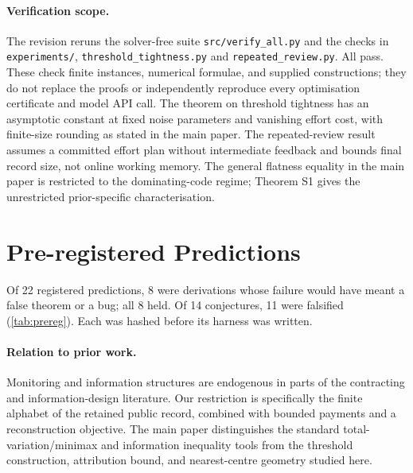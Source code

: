 \documentclass[sigconf,anonymous,acmthm=false]{aamas}
\theoremstyle{acmplain}
\theoremstyle{acmdefinition}
\begin{document}
\paragraph{Verification scope.} The revision reruns the solver-free suite
\texttt{src/verify\_all.py} and the checks in \texttt{experiments/},
\texttt{threshold\_tightness.py} and
\texttt{repeated\_review.py}. All pass. These check finite instances,
numerical formulae, and supplied constructions; they do not replace the proofs
or independently reproduce every optimisation certificate and model API call.
The theorem on threshold tightness has an asymptotic constant at fixed noise
parameters and vanishing effort cost, with finite-size rounding as stated in
the main paper. The repeated-review result assumes a committed effort plan
without intermediate feedback and bounds final record size, not online
working memory. The general flatness equality in the main paper is restricted
to the dominating-code regime; Theorem S1 gives the unrestricted prior-specific
characterisation.

\section{Pre-registered Predictions}
Of 22 registered predictions, 8 were derivations whose failure would have meant a false
theorem or a bug; all 8 held. Of 14 conjectures, 11 were falsified (\cref{tab:prereg}). Each
was hashed before its harness was written.




\paragraph{Relation to prior work.} Monitoring and information structures are
endogenous in parts of the contracting and information-design literature.
Our restriction is specifically the finite alphabet of the retained public
record, combined with bounded payments and a reconstruction objective. The
main paper distinguishes the standard total-variation/minimax and information
inequality tools from the threshold construction, attribution bound, and
nearest-centre geometry studied here.
\end{document}
